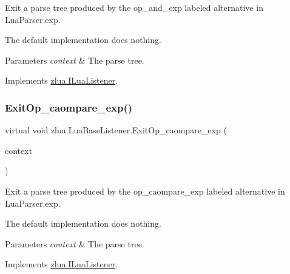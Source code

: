 Exit a parse tree produced by the {\ttfamily op\+\_\+and\+\_\+exp} labeled alternative in Lua\+Parser.\+exp. 

The default implementation does nothing.


\begin{DoxyParams}{Parameters}
{\em context} & The parse tree.\\
\hline
\end{DoxyParams}


Implements \mbox{\hyperlink{interfacezlua_1_1_i_lua_listener_a87ea223ce3d022a98247e31bcdd4490d}{zlua.\+I\+Lua\+Listener}}.

\mbox{\label{classzlua_1_1_lua_base_listener_a0969ff285a2df8e85f1c63245d167077}} 
\subsubsection{\texorpdfstring{Exit\+Op\+\_\+caompare\+\_\+exp()}{ExitOp\_caompare\_exp()}}
{\footnotesize\ttfamily virtual void zlua.\+Lua\+Base\+Listener.\+Exit\+Op\+\_\+caompare\+\_\+exp (\begin{DoxyParamCaption}\item[{\mbox{[}\+Not\+Null\mbox{]} \mbox{\hyperlink{classzlua_1_1_lua_parser_1_1_op__caompare__exp_context}{Lua\+Parser.\+Op\+\_\+caompare\+\_\+exp\+Context}}}]{context }\end{DoxyParamCaption})\hspace{0.3cm}{\ttfamily [virtual]}}



Exit a parse tree produced by the {\ttfamily op\+\_\+caompare\+\_\+exp} labeled alternative in Lua\+Parser.\+exp. 

The default implementation does nothing.


\begin{DoxyParams}{Parameters}
{\em context} & The parse tree.\\
\hline
\end{DoxyParams}


Implements \mbox{\hyperlink{interfacezlua_1_1_i_lua_listener_a9ad347c8ee340aeff0c0f8bb311cae0a}{zlua.\+I\+Lua\+Listener}}.

\mbox{\label{classzlua_1_1_lua_base_listener_a5daf4d3857a7580b51667c00c5395db1}} 
